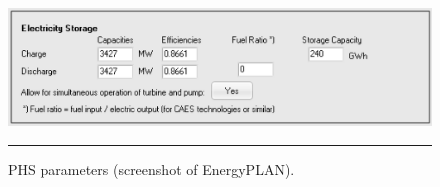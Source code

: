 \begin{figure}[htbp]
	\centering
	\includegraphics[width=\textwidth]{figures/B02_PHS.png}
	\rule{\textwidth}{0.5pt} %
	\caption{PHS parameters (screenshot of EnergyPLAN).}
	\label{fig:B02-PHS}
\end{figure}